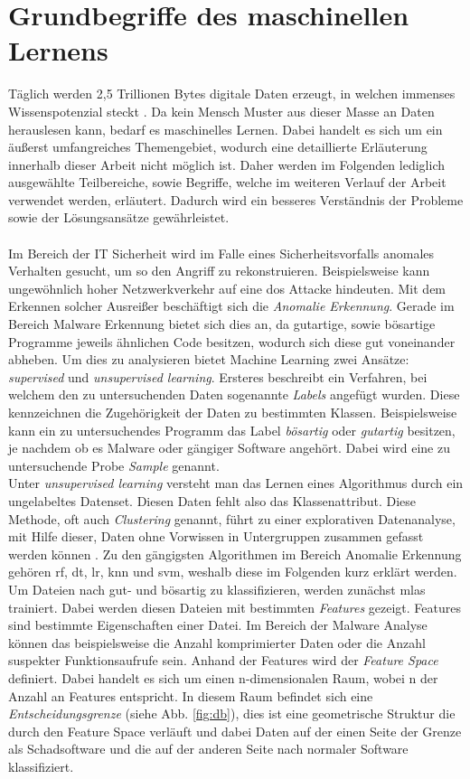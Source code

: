 \documentclass[
    12pt, %
    DIV10,
    ngerman, %
    a4paper, %
    oneside, %
    titlepage, %
    parskip=half, %
    headings=normal, %
    listof=totoc, %
    bibliography=totoc, %
    index=totoc, %
    captions=tableheading, %
    final %
]{scrreprt}
\begin{document}
\section{Grundbegriffe des maschinellen Lernens}\label{sec:ml}
Täglich werden 2,5 Trillionen Bytes digitale Daten erzeugt, in welchen immenses Wissenspotenzial steckt \parencite{MerlinOne}. Da kein Mensch Muster aus dieser Masse an Daten herauslesen kann, bedarf es maschinelles Lernen. Dabei handelt es sich um ein äu{\ss}erst umfangreiches Themengebiet, wodurch eine detaillierte Erläuterung innerhalb dieser Arbeit nicht möglich ist. Daher werden im Folgenden lediglich ausgewählte Teilbereiche, sowie Begriffe, welche im weiteren Verlauf der Arbeit verwendet werden, erläutert. Dadurch wird ein besseres Verständnis der Probleme sowie der Lösungsansätze gewährleistet.\\\\
Im Bereich der IT Sicherheit wird im Falle eines Sicherheitsvorfalls anomales Verhalten gesucht, um so den Angriff zu rekonstruieren. Beispielsweise kann ungewöhnlich hoher Netzwerkverkehr auf eine \ac{dos} Attacke hindeuten. Mit dem Erkennen solcher Ausrei{\ss}er beschäftigt sich die \emph{Anomalie Erkennung}. Gerade im Bereich Malware Erkennung bietet sich dies an, da gutartige, sowie bösartige Programme jeweils ähnlichen Code besitzen, wodurch sich diese gut voneinander abheben. Um dies zu analysieren bietet Machine Learning zwei Ansätze: \emph{supervised} und \emph{unsupervised learning}. Ersteres beschreibt ein Verfahren, bei welchem den zu untersuchenden Daten sogenannte \emph{Labels} angefügt wurden. Diese kennzeichnen die Zugehörigkeit der Daten zu bestimmten Klassen. Beispielsweise kann ein zu untersuchendes Programm das Label \emph{bösartig} oder \emph{gutartig} besitzen, je nachdem ob es Malware oder gängiger Software angehört. Dabei wird eine zu untersuchende Probe \emph{Sample} genannt.\\
Unter \emph{unsupervised learning} versteht man das Lernen eines Algorithmus durch ein ungelabeltes Datenset. Diesen Daten fehlt also das Klassenattribut. Diese Methode, oft auch \emph{Clustering} genannt, führt zu einer explorativen Datenanalyse, mit Hilfe dieser, Daten ohne Vorwissen in Untergruppen zusammen gefasst werden können \parencite{raschka2017python}.
Zu den gängigsten Algorithmen im Bereich Anomalie Erkennung gehören \ac{rf}, \ac{dt}, \ac{lr}, \ac{knn} und \ac{svm}, weshalb diese im Folgenden kurz erklärt werden.\\
Um Dateien nach gut- und bösartig zu klassifizieren, werden zunächst \ac{mlas} trainiert. Dabei werden diesen Dateien mit bestimmten \emph{Features} gezeigt. Features sind bestimmte Eigenschaften einer Datei. Im Bereich der Malware Analyse können das beispielsweise die Anzahl komprimierter Daten oder die Anzahl suspekter Funktionsaufrufe sein. Anhand der Features wird der \emph{Feature Space} definiert. Dabei handelt es sich um einen n-dimensionalen Raum, wobei n der Anzahl an Features entspricht. In diesem Raum befindet sich eine \emph{Entscheidungsgrenze} (siehe Abb. \ref{fig:db}), dies ist eine geometrische Struktur die durch den Feature Space verläuft und dabei Daten auf der einen Seite der Grenze als Schadsoftware und die auf der anderen Seite nach normaler Software klassifiziert.
\end{document}
